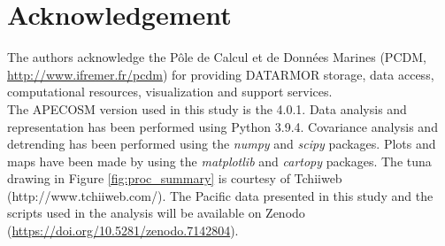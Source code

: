 \documentclass[review, 12pt]{elsarticle}
\begin{document}






\section*{Acknowledgement}

The authors acknowledge the Pôle de Calcul et de Données Marines (PCDM, \url{http://www.ifremer.fr/pcdm}) for providing DATARMOR storage, data access, computational resources, visualization and support services. \\
The APECOSM version used in this study is the 4.0.1.
Data analysis and representation has been performed using Python 3.9.4. 
Covariance analysis and detrending has been performed using the \emph{numpy} and \emph{scipy} packages. Plots and maps have been made by using the \emph{matplotlib} and \emph{cartopy} packages. The tuna drawing in Figure \ref{fig:proc_summary} is courtesy of Tchiiweb (http://www.tchiiweb.com/). The Pacific data presented in this study and the scripts used in the analysis will be available on Zenodo (\url{https://doi.org/10.5281/zenodo.7142804}).

\listoffigures
\listoftables

\clearpage


\end{document}
